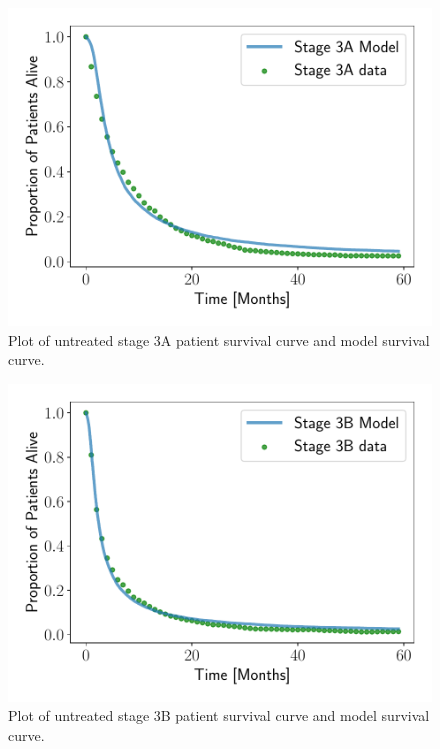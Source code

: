 \documentclass[letterpaper
, superscriptaddress
, twocolumn
, aps
]{revtex4}
\begin{document}
\begin{figure}
	\includegraphics[width=1.00\columnwidth]{Figures/stage3A.pdf}
	\caption{Plot of untreated stage 3A patient survival curve and model survival curve.}
	\label{s3A}
\end{figure}
\begin{figure}
	\includegraphics[width=1.00\columnwidth]{Figures/stage3B.pdf}
		\caption{Plot of untreated stage 3B patient survival curve and model survival curve.}
		\label{s3B}
\end{figure}
\end{document}
